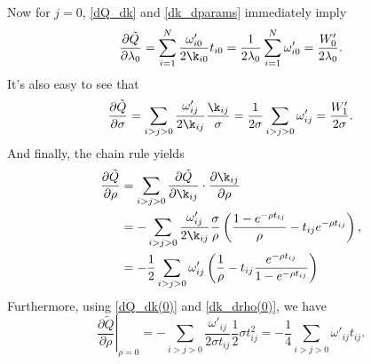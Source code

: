 \documentclass[12pt,leqno]{article}
\begin{document}
Now for $j = 0$,  \eqref{dQ_dk} and \eqref{dk_dparams} immediately imply
\begin{equation}\label{dQ_dlambda}
\frac{\partial\tilde{Q}}{\partial\lambda_0} = \sum_{i=1}^N\frac{\omega'_{i0}}{2\k_{i0}}t_{i0} 
= \frac{1}{2\lambda_0}\sum_{i=1}^N\omega'_{i0} = \frac{W'_0}{2\lambda_0}.
\end{equation}
It's also easy to see that
\begin{equation}\label{dQ_dsigma}
  \frac{\partial\tilde{Q}}{\partial\sigma} = \sum_{i>j>0}\frac{\omega'_{ij}}{2\k_{ij}}\frac{\k_{ij}}{\sigma} 
= \frac{1}{2\sigma}\sum_{i>j>0}\omega'_{ij} = \frac{W'_1}{2\sigma}.
\end{equation}
And finally, the chain rule yields
\begin{equation}\label{dQ_drho}
\begin{split}
  \frac{\partial\tilde{Q}}{\partial\rho} &= \sum_{i>j>0}\frac{\partial\tilde{Q}}{\partial\k_{ij}}\cdot
  \frac{\partial\k_{ij}}{\partial\rho}\\
&= -\sum_{i>j>0}\frac{\omega'_{ij}}{2\k_{ij}}\frac{\sigma}{\rho}\left(\frac{1-e^{-\rho{t_{tj}}}}{\rho} - t_{ij}e^{-\rho{t_{ij}}}\right), \\
&= -\frac{1}{2}\sum_{i>j>0}\omega'_{ij}\left(\frac{1}{\rho} - t_{ij}\frac{e^{-\rho{t_{ij}}}}{1-e^{-\rho t_{ij}}}\right)\\
\end{split}
\end{equation}
Furthermore, using \eqref{dQ_dk(0)} and \eqref{dk_drho(0)}, we have
\begin{equation}\label{dQ_drho(0)}
  \left.\frac{\partial\tilde{Q}}{\partial\rho}\right|_{\rho=0} = -\sum_{i>j>0}\frac{\omega'_{ij}}{2\sigma t_{ij}}\frac{1}{2}\sigma t_{ij}^2 = -\frac{1}{4}\sum_{i>j>0}\omega'_{ij}t_{ij}.
\end{equation}
    
    
\end{document}
